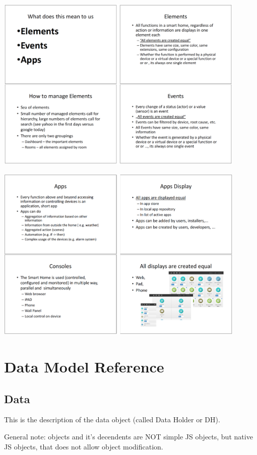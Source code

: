 \includegraphics[width=0.9\textwidth]{pngs/funslides2.png}

\includegraphics[width=0.9\textwidth]{pngs/funslides3.png}


\chapter{\zway Data Model Reference}
\label{annexdatamodel}

\section{Data}

This is the description of the data object (called Data Holder or DH).

General note: \zway objects and it's decendents are NOT simple JS objects, but native 
JS objects, that does not allow object modification.

